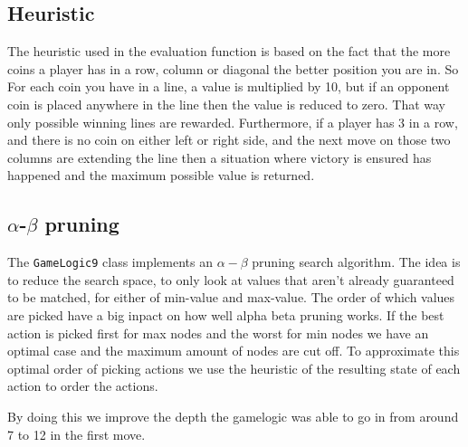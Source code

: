 \subsection{Heuristic}
The heuristic used in the evaluation function is based on the fact that the more coins a player has in a row, column or diagonal the better position you are in. So For each coin you have in a line, a value is multiplied by 10, but if an opponent coin is placed anywhere in the line then the value is reduced to zero. That way only possible winning lines are rewarded. Furthermore, if a player has 3 in a row, and there is no coin on either left or right side, and the next move on those two columns are extending the line then a situation where victory is ensured has happened and the maximum possible value is returned.

\subsection{$\alpha$-$\beta$ pruning}
The \texttt{GameLogic9} class implements an $\alpha-\beta$ pruning search algorithm. The idea is to reduce the search space, to only look at values that aren't already guaranteed to be matched, for either of min-value and max-value. The order of which values are picked have a big inpact on how well alpha beta pruning works. If the best action is picked first for max nodes and the worst for min nodes we have an optimal case and the maximum amount of nodes are cut off. To approximate this optimal order of picking actions we use the heuristic of the resulting state of each action to order the actions. 

By doing this we improve the depth the gamelogic was able to go in from around 7 to 12 in the first move.